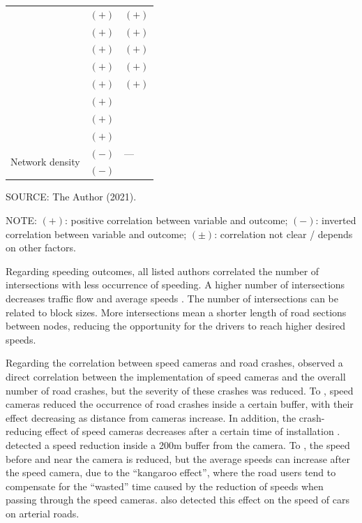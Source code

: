\begin{table}[!hbtp]
\begin{tabular}{p{2.5cm}p{6.2cm}p{6.2cm}}
         & $(+)$ \textcite{Dumbaugh2011} & $(+)$ \textcite{Dumbaugh2013} \\
         & $(+)$ \textcite{Dumbaugh2013} & $(+)$ \textcite{Ewing2009} \\
         & $(+)$ \textcite{Ewing2009} & $(+)$ \textcite{Huang2018} \\
         & $(+)$ \textcite{Huang2018} & $(+)$ \textcite{Obelheiro2020} \\
         & $(+)$ \textcite{Obelheiro2020} & $(+)$ \textcite{Welle2016} \\
         & $(+)$ \textcite{Ukkusuri2012} &  \\
         & $(+)$ \textcite{Welle2016} &  \\
         & $(+)$ \textcite{Yu2017} &  \\ \hline
        \multirow{2}{2cm}{Network density} & $(-)$ \textcite{Marshall2010} & --- \\
         & $(-)$ \textcite{Marshall2011} &  \\ \hline
        \end{tabular}
    \label{tab:design}
    \par \vspace{1mm} \footnotesize \raggedright
    SOURCE: The Author (2021).
    \par \vspace{1mm} \footnotesize \raggedright
    NOTE: $(+)$: positive correlation between variable and outcome; $(-)$: inverted correlation between variable and outcome; $(\pm)$: correlation not clear / depends on other factors.
\end{table}

Regarding speeding outcomes, all listed authors correlated the number of intersections with less occurrence of speeding. A higher number of intersections decreases traffic flow and average speeds \cite{Elvik2009,Ewing2009}. The number of intersections can be related to block sizes. More intersections mean a shorter length of road sections between nodes, reducing the opportunity for the drivers to reach higher desired speeds.

Regarding the correlation between speed cameras and road crashes, \textcite{Park2019} observed a direct correlation between the implementation of speed cameras and the overall number of road crashes, but the severity of these crashes was reduced. To \textcite{Høye2015,Li2013a}, speed cameras reduced the occurrence of road crashes inside a certain buffer, with their effect decreasing as distance from cameras increase. In addition, the crash-reducing effect of speed cameras decreases after a certain time of installation \cite{Li2020}. \textcite{Li2013a,Oliveira2015} detected a speed reduction inside a 200m buffer from the camera. To \textcite{Li2020}, the speed before and near the camera is reduced, but the average speeds can increase after the speed camera, due to the ``kangaroo effect'', where the road users tend to compensate for the ``wasted'' time caused by the reduction of speeds when passing through the speed cameras. \textcite{Amancio2021} also detected this effect on the speed of cars on arterial roads. 

